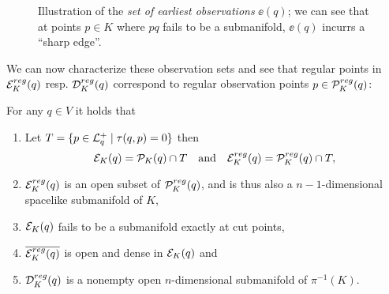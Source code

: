 \begin{figure}\label{fig:EKDef}
    \centering
    
    \caption{
        Illustration of the \emph{set of earliest observations} $\ee(q)$; we can see that at points $p\in K$ where $pq$ fails to be a submanifold, $\ee(q)$ incurrs a \enquote{sharp edge}.
    }
\end{figure}

We can now characterize these observation sets and see that regular points in ${{\mathcal{E}}^{reg}_K}(q)$ resp. ${\mathcal{D}}^{reg}_K(q)$ correspond to regular observation points $p\in {\mathcal{P}}^{reg}_K(q)$:
\begin{proposition}\label{prop:submanifolds}
For any $q\in V$ it holds that
\begin{enumerate}[label={\textnormal{(\arabic*)}}]
    \item Let $T=\{p\in {\mathcal{L}}^+_q \mid \tau(q,p)=0\}$ then 
    \[
        {\mathcal{E}}_K(q) = {\mathcal{P}}_K(q) \cap T \quad \text{and} \quad {\mathcal{E}}^{reg}_K(q) = {\mathcal{P}}^{reg}_K(q) \cap T,
    \]
    \item  ${\mathcal{E}}^{reg}_K(q)$ is an open subset of ${\mathcal{P}}^{reg}_K(q)$, and is thus also a $n-1$-dimensional spacelike submanifold of $K$,
    \item ${\mathcal{E}}_K(q)$ fails to be a submanifold exactly at cut points,
    \item $\overline{{\mathcal{E}}^{reg}_K(q)}$ is open and dense in ${\mathcal{E}}_K(q)$ and
    \item ${\mathcal{D}}^{reg}_K(q)$ is a nonempty open $n$-dimensional submanifold of $\pi^{-1}(K)$.
\end{enumerate}
\end{proposition}
